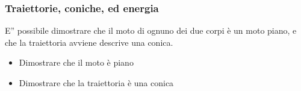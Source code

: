 \documentclass[letterpaper,10pt,italian]{jupyterBook}
\begin{document}
\subsubsection{Traiettorie, coniche, ed energia}
\label{\detokenize{ch/mechanics/dynamics-motion-gravitation:traiettorie-coniche-ed-energia}}
\sphinxAtStartPar
E” possibile dimostrare che il moto di ognuno dei due corpi è un moto piano, e che la traiettoria avviene descrive una conica.
\begin{itemize}
\item {} 
\sphinxAtStartPar
{} Dimostrare che il moto è piano

\item {} 
\sphinxAtStartPar
{} Dimostrare che la traiettoria è una conica

\end{itemize}
\end{document}
